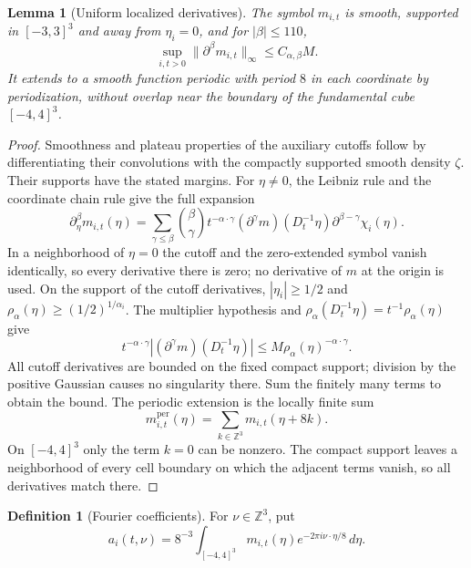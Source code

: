 \documentclass[12pt,reqno]{amsart}
\theoremstyle{plain}
\newtheorem{lemma}[theorem]{Lemma}
\theoremstyle{definition}
\newtheorem{definition}[theorem]{Definition}
\theoremstyle{remark}
\numberwithin{equation}{section}
\newcommand{\Z}{\mathbb Z}
\newcommand{\dd}{\,d}
\begin{document}
\begin{lemma}[Uniform localized derivatives]\label{lem:symbol_derivatives}
The symbol $m_{i,t}$ is smooth, supported in $[-3,3]^3$ and away
from $\eta_i=0$, and for $|\beta|\le110$,
\[
 \sup_{i,t>0}\|\partial^\beta m_{i,t}\|_\infty\le C_{\alpha,\beta}M.
\]
It extends to a smooth function periodic with period $8$ in each
coordinate by periodization, without overlap near the boundary of
the fundamental cube $[-4,4]^3$.
\end{lemma}
\begin{proof}
Smoothness and plateau properties of the auxiliary cutoffs follow by
differentiating their convolutions with the compactly supported smooth
density $\zeta$. Their supports have the stated margins.
For $\eta\ne0$, the Leibniz rule and the coordinate chain rule give
the full expansion
\[
 \partial_\eta^\beta m_{i,t}(\eta)
 =\sum_{\gamma\le\beta}\binom{\beta}{\gamma}
 t^{-\alpha\cdot\gamma}(\partial^\gamma m)(D_t^{-1}\eta)
                  \partial^{\beta-\gamma}\chi_i(\eta).
\]
In a neighborhood of $\eta=0$ the cutoff and the zero-extended
symbol vanish identically, so every derivative there is zero;
no derivative of $m$ at the origin is used.
On the support of the cutoff derivatives, $|\eta_i|\ge1/2$ and
$\rho_\alpha(\eta)\ge(1/2)^{1/\alpha_i}$. The multiplier hypothesis
and $\rho_\alpha(D_t^{-1}\eta)=t^{-1}\rho_\alpha(\eta)$ give
\[
 t^{-\alpha\cdot\gamma}|(\partial^\gamma m)(D_t^{-1}\eta)|
 \le M\rho_\alpha(\eta)^{-\alpha\cdot\gamma}.
\]
All cutoff derivatives are bounded on the fixed compact support;
division by the positive Gaussian causes no singularity there.
Sum the finitely many terms to obtain the bound.
The periodic extension is the locally finite sum
\[
 m_{i,t}^{\mathrm{per}}(\eta)
       =\sum_{k\in\Z^3}m_{i,t}(\eta+8k).
\]
On $[-4,4]^3$ only the term $k=0$ can be nonzero. The compact
support leaves a neighborhood of every cell boundary on which
the adjacent terms vanish, so all derivatives match there.
\end{proof}

\begin{definition}[Fourier coefficients]\label{def:fourier_coefficients}
For $\nu\in\Z^3$, put
\[
 a_i(t,\nu)=8^{-3}\int_{[-4,4]^3}m_{i,t}(\eta)
                                   e^{-2\pi i\nu\cdot\eta/8}\dd\eta.
\]
\end{definition}
\end{document}
